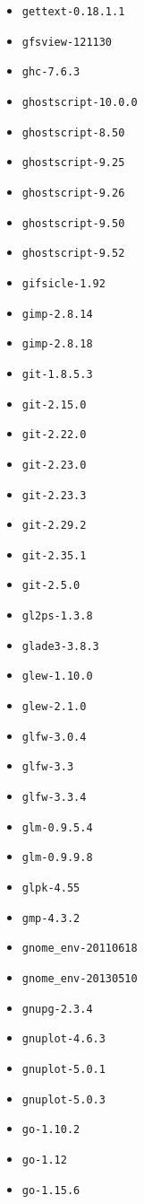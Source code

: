 \begin{multicols}{3}
\begin{itemize}
\item \verb|gettext-0.18.1.1|
\item \verb|gfsview-121130|
\item \verb|ghc-7.6.3|
\item \verb|ghostscript-10.0.0|
\item \verb|ghostscript-8.50|
\item \verb|ghostscript-9.25|
\item \verb|ghostscript-9.26|
\item \verb|ghostscript-9.50|
\item \verb|ghostscript-9.52|
\item \verb|gifsicle-1.92|
\item \verb|gimp-2.8.14|
\item \verb|gimp-2.8.18|
\item \verb|git-1.8.5.3|
\item \verb|git-2.15.0|
\item \verb|git-2.22.0|
\item \verb|git-2.23.0|
\item \verb|git-2.23.3|
\item \verb|git-2.29.2|
\item \verb|git-2.35.1|
\item \verb|git-2.5.0|
\item \verb|gl2ps-1.3.8|
\item \verb|glade3-3.8.3|
\item \verb|glew-1.10.0|
\item \verb|glew-2.1.0|
\item \verb|glfw-3.0.4|
\item \verb|glfw-3.3|
\item \verb|glfw-3.3.4|
\item \verb|glm-0.9.5.4|
\item \verb|glm-0.9.9.8|
\item \verb|glpk-4.55|
\item \verb|gmp-4.3.2|
\item \verb|gnome_env-20110618|
\item \verb|gnome_env-20130510|
\item \verb|gnupg-2.3.4|
\item \verb|gnuplot-4.6.3|
\item \verb|gnuplot-5.0.1|
\item \verb|gnuplot-5.0.3|
\item \verb|go-1.10.2|
\item \verb|go-1.12|
\item \verb|go-1.15.6|

\end{itemize}
\end{multicols}
